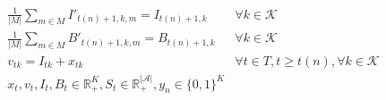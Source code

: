 \documentclass[10pt]{article}
\newcommand{\ti}{t} %
\newcommand{\ka}{k} %
\newcommand{\KA}{\mathcal{K}}
\newcommand{\Ka}{K}
\newcommand{\jey}{j} %
\newcommand{\Graf}{\mathcal{A}} %
\newcommand{\Bi}{B} %
\newcommand{\Csub}{\mathcal{K}^+_k}
\newcommand{\Psub}{\mathcal{K}^-_k}
\begin{document}
\begin{subequations}
\begin{flalign}
& \frac{1}{|M|} \sum_{m \in M} I'_{\ti(n)+1,k,m} = I_{\ti(n)+1, \ka} &\forall \ka \in \KA & \label{eq:Average_Inventory} \\
& \frac{1}{|M|} \sum_{m \in M} B'_{\ti(n)+1,k,m} = B_{\ti(n)+1, \ka} &\forall \ka \in \KA & \label{eq:Average_Backlog}\\
& v_{\ti \ka} = I_{\ti \ka} + x_{\ti \ka}  \quad &\forall t \in T, t \geq \ti(n),\forall \ka \in \KA \\
&{x}_{ \ti },  {v}_{ \ti },  {I}_{ \ti} , {\Bi}_{ \ti } \in \mathbb{R}_{+}^{\Ka} , {S}_{\ti} \in \mathbb{R}_{+}^{|\Graf|} ,{y}_{ n } \in \{0,1\}^{\Ka} & \label{eq:Sub_FD_bound3}
\end{flalign}

  \end{subequations}
  
\end{document}
